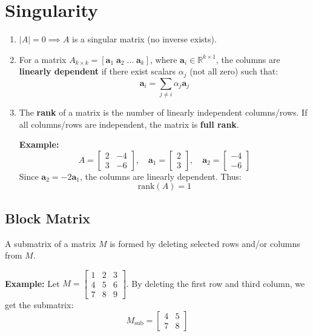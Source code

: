 \documentclass{article}
\begin{document}
\section{Singularity}
\begin{enumerate}
    \item \( |A| = 0 \implies A \) is a singular matrix (no inverse exists).
    
    \item For a matrix \( A_{k \times k} = [\mathbf{a}_1 \; \mathbf{a}_2 \; \dots \; \mathbf{a}_k] \), where \( \mathbf{a}_i \in \mathbb{R}^{k \times 1} \), the columns are \textbf{linearly dependent} if there exist scalars \( \alpha_j \) (not all zero) such that:
    \[
    \mathbf{a}_i = \sum_{j \neq i} \alpha_j \mathbf{a}_j
    \]
    
    \item The \textbf{rank} of a matrix is the number of linearly independent columns/rows. If all columns/rows are independent, the matrix is \textbf{full rank}.
    
    \textbf{Example:}
    \[
    A = \begin{bmatrix}
        2 & -4 \\
        3 & -6 
    \end{bmatrix}, \quad
    \mathbf{a}_1 = \begin{bmatrix} 2 \\ 3 \end{bmatrix}, \quad
    \mathbf{a}_2 = \begin{bmatrix} -4 \\ -6 \end{bmatrix}
    \]
    Since \( \mathbf{a}_2 = -2\mathbf{a}_1 \), the columns are linearly dependent. Thus:
    \[
    \text{rank}(A) = 1
    \]
\end{enumerate}
\subsection{Block Matrix}
A submatrix of a matrix \( M \) is formed by deleting selected rows and/or columns from \( M \).

\textbf{Example:}
Let \( M = \begin{bmatrix}
1 & 2 & 3 \\
4 & 5 & 6 \\
7 & 8 & 9
\end{bmatrix} \). By deleting the first row and third column, we get the submatrix:
\[
M_{\text{sub}} = \begin{bmatrix}
4 & 5 \\
7 & 8
\end{bmatrix}
\]
\end{document}
